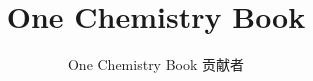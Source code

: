 \documentclass[11pt,a4paper,twoside,openany]{book}
\title{One Chemistry Book}
\author{One Chemistry Book 贡献者}
\date{\bookdate}
\begin{document}
\frontmatter




\tableofcontents

\mainmatter



\appendix
\part{\omsolutionspart}


\backmatter
\printindex
\end{document}
